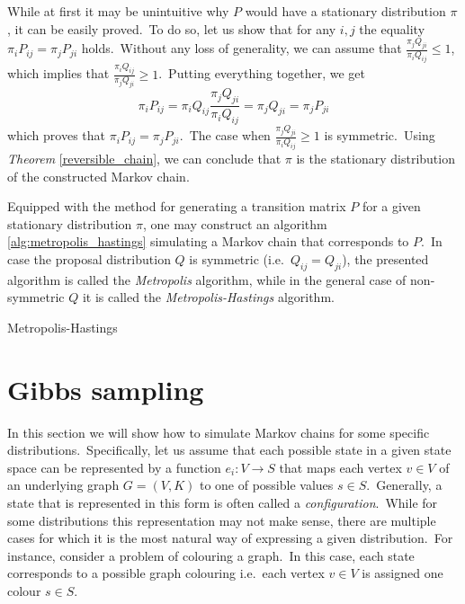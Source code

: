 \documentclass[shortabstract, english, lic]{iithesis}
\theoremstyle{default_theorem_style}\newtheorem{theorem}{Theorem}
\theoremstyle{default_theorem_style}\newtheorem{definition}{Definition}
\begin{document}
\noindent While at first it may be unintuitive why $P$ would have a stationary distribution $\pi$, it can be easily
proved.\ To do so, let us show that for any $i, j$ the equality $\pi_i P_{ij} = \pi_j P_{ji}$ holds.\ Without
any loss of generality, we can assume that $\frac{\pi_j Q_{ji}}{\pi_i Q_{ij}} \leq 1$, which implies that
$\frac{\pi_i Q_{ij}}{\pi_j Q_{ji}} \geq 1$.\ Putting everything together, we get
$$
\pi_i P_{ij} = \pi_i Q_{ij} \frac{\pi_j Q_{ji}}{\pi_i Q_{ij}} = \pi_j Q_{ji} = \pi_j P_{ji}
$$
which proves that $\pi_i P_{ij} = \pi_j P_{ji}$.\ The case when $\frac{\pi_j Q_{ji}}{\pi_i Q_{ij}} \geq 1$ is
symmetric.\ Using \textit{Theorem} \ref{reversible_chain}, we can conclude that $\pi$ is the stationary distribution
of the constructed Markov chain.\newline

\noindent Equipped with the method for generating a transition matrix $P$ for a given stationary distribution $\pi$,
one may construct an algorithm \ref{alg:metropolis_hastings} simulating a Markov chain that corresponds to $P$.\ In
case the proposal distribution $Q$ is symmetric (i.e.\ $Q_{ij} = Q_{ji}$), the presented algorithm is called the
\textit{Metropolis} algorithm, while in the general case of non-symmetric $Q$ it is called the
\textit{Metropolis-Hastings} algorithm.


\begin{algorithm}[tb]
\caption{Metropolis-Hastings}\label{alg:metropolis_hastings}
\begin{algorithmic}[1]
\Else
\EndIf
{}
\end{algorithmic}
\end{algorithm}

\section{Gibbs sampling}\label{sec:gibbs_sampling}

\noindent In this section we will show how to simulate Markov chains for some specific distributions.\ Specifically,
let us assume that each possible state in a given state space can be represented by a function $e_i : V \to S$ that
maps each vertex $v \in V$ of an underlying graph $G = (V, K)$ to one of possible values $s \in S$.\ Generally, a state
that is represented in this form is often called a \textit{configuration}.\ While for some distributions this
representation may not make sense, there are multiple cases for which it is the most natural way of expressing a
given distribution.\ For instance, consider a problem of colouring a graph.\ In this case, each state corresponds to a
possible graph colouring i.e.\ each vertex $v \in V$ is assigned one colour $s \in S$.\newline
\end{document}
